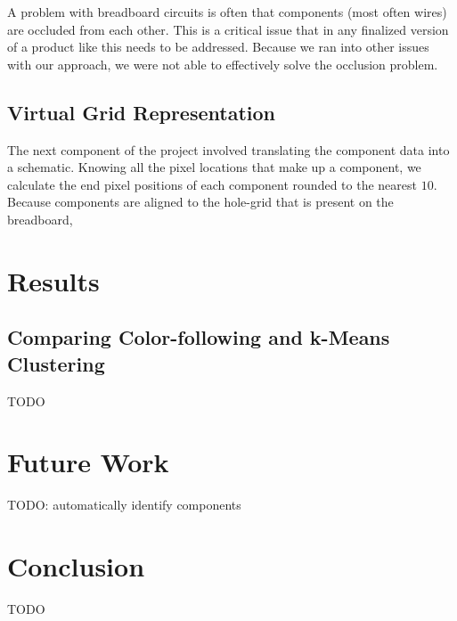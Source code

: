 \documentclass[10pt,twocolumn,letterpaper]{article}
\begin{document}
A problem with breadboard circuits is often that components (most often wires)
are occluded from each other. This is a critical issue that in any finalized
version of a product like this needs to be addressed. Because we ran into other
issues with our approach, we were not able to effectively solve the occlusion
problem.  

\subsection{Virtual Grid Representation}

The next component of the project involved translating the component data into
a schematic. Knowing all the pixel locations that make up a component, we
calculate the end pixel positions of each component rounded to the nearest
$10$. Because components are aligned to the hole-grid that is present on the
breadboard,  

\section{Results}

\subsection{Comparing Color-following and k-Means Clustering}

TODO

\section{Future Work}

TODO: automatically identify components

\section{Conclusion}

TODO

{\small


}
\end{document}
